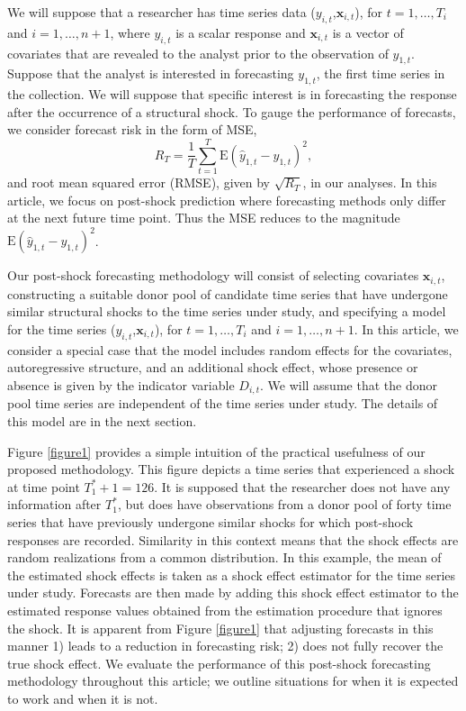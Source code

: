 \documentclass[11pt,3p,review,authoryear]{elsarticle}
\newcommand{\x}{\textbf{x}}
\def\E#1{\mathrm{E}(#1)} %
\theoremstyle{definition}
\begin{document}
We will suppose that a researcher has time series data ($y_{i,t}$,$\x_{i,t}$), for $t = 1, \ldots,  T_i$ and $i = 1, \ldots, n+1$, where $y_{i,t}$ is a scalar response and $\x_{i,t}$ is a vector of covariates that are revealed to the analyst prior to the observation of $y_{1,t}$.  Suppose that the analyst is interested in forecasting $y_{1,t}$, the first time series in the collection. We will suppose that specific interest is in forecasting the response after the occurrence of a structural shock. To gauge the performance of forecasts, we consider forecast risk in the form of MSE,
$$
  R_T = \frac{1}{T}\sum_{t=1}^T\E{\hat y_{1,t} - y_{1,t}}^2,
$$
and root mean squared error (RMSE), given by $\sqrt{R_T}$, in our analyses. In this article, we focus on post-shock prediction where forecasting methods only differ at the next future time point. Thus the MSE reduces to the magnitude $\E{\hat y_{1,t} - y_{1,t}}^2$.

Our post-shock forecasting methodology will consist of selecting covariates $\x_{i,t}$, constructing a suitable donor pool of candidate time series that have undergone similar structural shocks to the time series under study, and specifying a model for the time series ($y_{i,t}$,$\x_{i,t}$), for $t = 1, \ldots,  T_i$ and $i = 1, \ldots, n+1$. In this article, we consider a  special case that the model includes random effects for the covariates, autoregressive structure, and an additional shock effect, whose presence or absence is given by the indicator variable $D_{i,t}$.  We will assume that the donor pool time series are independent of the time series under study. The details of this model are in the next section.

Figure \ref{figure1} provides a simple intuition of the practical usefulness of our proposed methodology. This figure depicts a time series that experienced a shock at time point $T_1^*+1 = 126$. It is supposed that the researcher does not have any information after $T_1^*$, but does have observations from a donor pool of forty time series that have previously undergone similar shocks for which post-shock responses are recorded. Similarity in this context means that the shock effects are random realizations from a common distribution. In this example, the mean of the estimated shock effects is taken as a shock effect estimator for the time series under study. Forecasts are then made by adding this shock effect estimator to the estimated response values obtained from the estimation procedure that ignores the shock. It is apparent from Figure \ref{figure1} that adjusting forecasts in this manner 1) leads to a reduction in forecasting risk; 2) does not fully recover the true shock effect. We evaluate the performance of this post-shock forecasting methodology throughout this article; we outline situations for when it is expected to work and when it is not.
\end{document}
